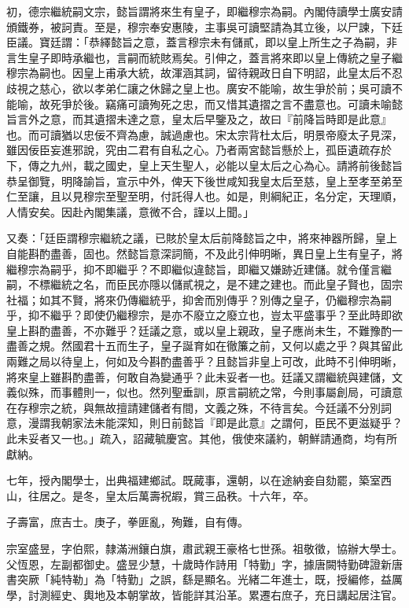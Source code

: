 \begin{pinyinscope}
初，德宗繼統嗣文宗，懿旨謂將來生有皇子，即繼穆宗為嗣。內閣侍讀學士廣安請頒鐵券，被訶責。至是，穆宗奉安惠陵，主事吳可讀堅請為其立後，以尸諫，下廷臣議。寶廷謂：「恭繹懿旨之意，蓋言穆宗未有儲貳，即以皇上所生之子為嗣，非言生皇子即時承繼也，言嗣而統賅焉矣。引伸之，蓋言將來即以皇上傳統之皇子繼穆宗為嗣也。因皇上甫承大統，故渾涵其詞，留待親政日自下明詔，此皇太后不忍歧視之慈心，欲以孝弟仁讓之休歸之皇上也。廣安不能喻，故生爭於前；吳可讀不能喻，故死爭於後。竊痛可讀殉死之忠，而又惜其遺摺之言不盡意也。可讀未喻懿旨言外之意，而其遺摺未達之意，皇太后早鑒及之，故曰『前降旨時即是此意』也。而可讀猶以忠佞不齊為慮，誠過慮也。宋太宗背杜太后，明景帝廢太子見深，雖因佞臣妄進邪說，究由二君有自私之心。乃者兩宮懿旨懸於上，孤臣遺疏存於下，傳之九州，載之國史，皇上天生聖人，必能以皇太后之心為心。請將前後懿旨恭呈御覽，明降諭旨，宣示中外，俾天下後世咸知我皇太后至慈，皇上至孝至弟至仁至讓，且以見穆宗至聖至明，付託得人也。如是，則綱紀正，名分定，天理順，人情安矣。因赴內閣集議，意微不合，謹以上聞。」

又奏：「廷臣謂穆宗繼統之議，已賅於皇太后前降懿旨之中，將來神器所歸，皇上自能斟酌盡善，固也。然懿旨意深詞簡，不及此引伸明晰，異日皇上生有皇子，將繼穆宗為嗣乎，抑不即繼乎？不即繼似違懿旨，即繼又嫌跡近建儲。就令僅言繼嗣，不標繼統之名，而臣民亦隱以儲貳視之，是不建之建也。而此皇子賢也，固宗社福；如其不賢，將來仍傳繼統乎，抑舍而別傳乎？別傳之皇子，仍繼穆宗為嗣乎，抑不繼乎？即使仍繼穆宗，是亦不廢立之廢立也，豈太平盛事乎？至此時即欲皇上斟酌盡善，不亦難乎？廷議之意，或以皇上親政，皇子應尚未生，不難豫酌一盡善之規。然國君十五而生子，皇子誕育如在徹簾之前，又何以處之乎？與其留此兩難之局以待皇上，何如及今斟酌盡善乎？且懿旨非皇上可改，此時不引伸明晰，將來皇上雖斟酌盡善，何敢自為變通乎？此未妥者一也。廷議又謂繼統與建儲，文義似殊，而事體則一，似也。然列聖垂訓，原言嗣統之常，今則事屬創局，可讀意在存穆宗之統，與無故擅請建儲者有間，文義之殊，不待言矣。今廷議不分別詞意，漫謂我朝家法未能深知，則日前懿旨『即是此意』之謂何，臣民不更滋疑乎？此未妥者又一也。」疏入，詔藏毓慶宮。其他，俄使來議約，朝鮮請通商，均有所獻納。

七年，授內閣學士，出典福建鄉試。既蕆事，還朝，以在途納妾自劾罷，築室西山，往居之。是冬，皇太后萬壽祝嘏，賞三品秩。十六年，卒。

子壽富，庶吉士。庚子，拳匪亂，殉難，自有傳。

宗室盛昱，字伯熙，隸滿洲鑲白旗，肅武親王豪格七世孫。祖敬徵，協辦大學士。父恆恩，左副都御史。盛昱少慧，十歲時作詩用「特勤」字，據唐闕特勤碑證新唐書突厥「純特勒」為「特勤」之誤，繇是顯名。光緒二年進士，既，授編修，益厲學，討測經史、輿地及本朝掌故，皆能詳其沿革。累遷右庶子，充日講起居注官。


\end{pinyinscope}
